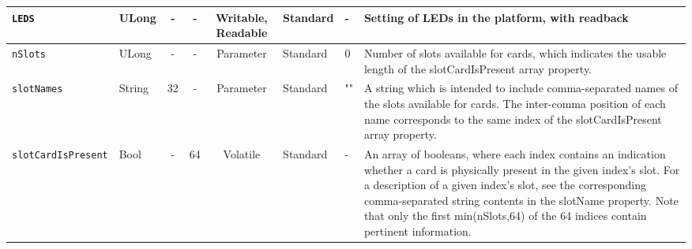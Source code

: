 \documentclass{article}
\begin{document}
\begin{landscape}
\begin{scriptsize}
\begin{tabular}{|p{3cm}|p{1.5cm}|c|c|c|p{1.5cm}|p{1cm}|p{6cm}|}
			\hline
			\verb+LEDS+        & ULong  & -              & -               & Writable, Readable & Standard    & -       & Setting of LEDs in the platform, with readback                                \\
			\hline
			\verb+nSlots+      & ULong  & -              & -               & Parameter & Standard & 0 & Number of slots available for cards, which indicates the usable length of the slotCardIsPresent array property. \\
			\hline
			\verb+slotNames+   & String & 32             & -               & Parameter & Standard & "" & A string which is intended to include comma-separated names of the slots available for cards. The inter-comma position of each name corresponds to the same index of the slotCardIsPresent array property. \\
			\hline
			\verb+slotCardIsPresent+ & Bool & -          & 64              & Volatile           & Standard    & -       & An array of booleans, where each index contains an indication whether a card is physically present in the given index's slot. For a description of a given index's slot, see the corresponding comma-separated string contents in the slotName property. Note that only the first min(nSlots,64) of the 64 indices contain pertinent information. \\
			\hline

		\end{tabular}
	\end{scriptsize}

\end{landscape}
\end{document}
